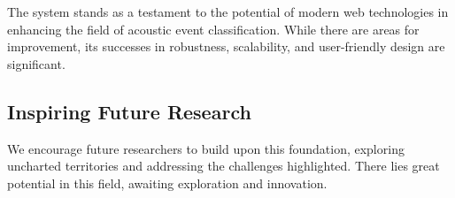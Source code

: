 The system stands as a testament to the potential of modern web technologies in enhancing the field of acoustic event classification. While there are areas for improvement, its successes in robustness, scalability, and user-friendly design are significant.

\subsection{Inspiring Future Research}

We encourage future researchers to build upon this foundation, exploring uncharted territories and addressing the challenges highlighted. There lies great potential in this field, awaiting exploration and innovation.